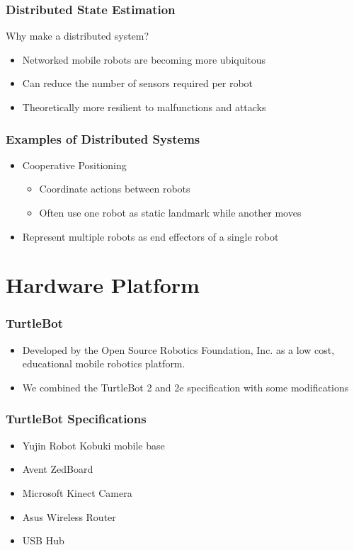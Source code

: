 \documentclass[14pt]{beamer}
\begin{document}
\begin{frame}
\frametitle{Distributed State Estimation}
Why make a distributed system?
\begin{itemize}
\item Networked mobile robots are becoming more ubiquitous
\item Can reduce the number of sensors required per robot
\item Theoretically more resilient to malfunctions and attacks
\end{itemize}
\end{frame}

\begin{frame}
\frametitle{Examples of Distributed Systems}
\begin{itemize}
\item Cooperative Positioning
    \begin{itemize}
    \item Coordinate actions between robots
    \item Often use one robot as static landmark while another moves
    \end{itemize}
    \vspace{14pt}
\item Represent multiple robots as end effectors of a single robot
\end{itemize}
\end{frame}

\section{Hardware Platform}
\begin{frame}
\frametitle{TurtleBot}
\begin{itemize}

\item Developed by the Open Source Robotics Foundation, Inc. as a low cost, educational mobile robotics platform.
\vspace{14pt}
\item We combined the TurtleBot 2 and 2e specification with some modifications
\end{itemize}
\end{frame}

\begin{frame}
\frametitle{TurtleBot Specifications}
\begin{itemize}
\item Yujin Robot Kobuki mobile base
\item Avent ZedBoard
\item Microsoft Kinect Camera
\item Asus Wireless Router
\item USB Hub
\end{itemize}
\end{frame}
\end{document}
